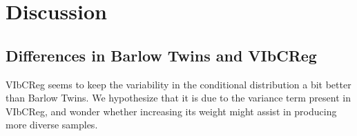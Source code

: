 \documentclass[../../thesis.tex]{subfiles}
\begin{document}



\section{Discussion}

\subsection{Differences in Barlow Twins and VIbCReg}

VIbCReg seems to keep the variability in the conditional distribution a bit better than Barlow Twins. We hypothesize that it is due to the variance term present in VIbCReg, and wonder whether increasing its weight might assist in producing more diverse samples. 
\end{document}
